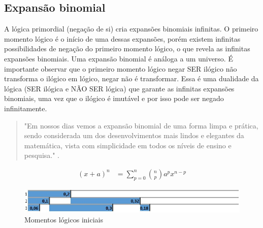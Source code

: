 \subsection{Expansão binomial}
A lógica primordial (negação de si) cria expansões binomiais infinitas. O primeiro momento lógico é o início de uma dessas expansões, porém existem infinitas possibilidades de negação do primeiro momento lógico, o que revela as infinitas expansões binomiais. Uma expansão binomial é análoga a um universo. É importante observar que o primeiro momento lógico negar SER ilógico não transforma o ilógico em lógico, negar não é transformar. Essa é uma dualidade da lógica (SER ilógica e NÃO SER lógica) que garante as infinitas expansões binomiais, uma vez que o ilógico é imutável e por isso pode ser negado infinitamente.

\begin{quote}
"Em nossos dias vemos a expansão binomial de uma forma limpa e prática, sendo considerada um dos desenvolvimentos mais lindos e elegantes da matemática, vista com simplicidade em todos os níveis de ensino e pesquisa." \cite{ufpr_binomio_newton}.
\end{quote}
\begin{align*}
(x+a)^n &= \sum_{p=0}^{n}\binom{n}{p} a^p x^{n-p}
\end{align*}

\begin{figure}[H]
\caption{Momentos lógicos iniciais}
\label{fig:third_logical_moment}
\centering
\includegraphics[scale=.85]{sections/images/third_logical_moment.jpg}
\end{figure}


